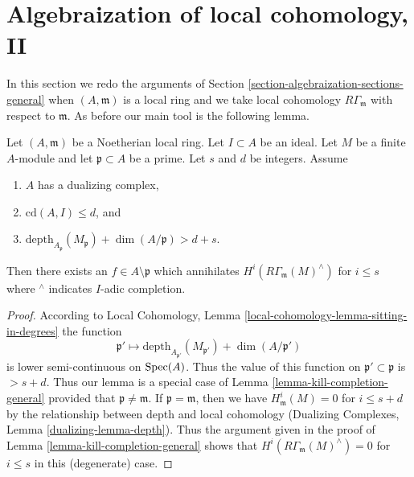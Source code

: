 \section{Algebraization of local cohomology, II}
\label{section-algebraization-punctured}

\noindent
In this section we redo the arguments of
Section \ref{section-algebraization-sections-general}
when $(A, \mathfrak m)$ is a local ring and we take local cohomology
$R\Gamma_\mathfrak m$ with respect to $\mathfrak m$. As before our
main tool is the following lemma.

\begin{lemma}
\label{lemma-kill-completion}
Let $(A, \mathfrak m)$ be a Noetherian local ring.
Let $I \subset A$ be an ideal. Let $M$ be a finite $A$-module and
let $\mathfrak p \subset A$ be a prime. Let $s$ and $d$ be integers. Assume
\begin{enumerate}
\item $A$ has a dualizing complex,
\item $\text{cd}(A, I) \leq d$, and
\item
$\text{depth}_{A_\mathfrak p}(M_\mathfrak p) + \dim(A/\mathfrak p) > d + s$.
\end{enumerate}
Then there exists an $f \in A \setminus \mathfrak p$ which annihilates
$H^i(R\Gamma_\mathfrak m(M)^\wedge)$ for $i \leq s$ where ${}^\wedge$
indicates $I$-adic completion.
\end{lemma}

\begin{proof}
According to Local Cohomology, Lemma
\ref{local-cohomology-lemma-sitting-in-degrees}
the function
$$
\mathfrak p' \longmapsto
\text{depth}_{A_{\mathfrak p'}}(M_{\mathfrak p'}) + \dim(A/\mathfrak p')
$$
is lower semi-continuous on $\mathop{\mathrm{Spec}}(A)$. Thus the value
of this function on $\mathfrak p' \subset \mathfrak p$
is $> s + d$. Thus our lemma is a special case of
Lemma \ref{lemma-kill-completion-general}
provided that $\mathfrak p \not = \mathfrak m$.
If $\mathfrak p = \mathfrak m$,
then we have $H^i_\mathfrak m(M) = 0$ for $i \leq s + d$ by
the relationship between depth and local cohomology
(Dualizing Complexes, Lemma \ref{dualizing-lemma-depth}).
Thus the argument given in the proof of
Lemma \ref{lemma-kill-completion-general}
shows that $H^i(R\Gamma_\mathfrak m(M)^\wedge) = 0$
for $i \leq s$ in this (degenerate) case.
\end{proof}

